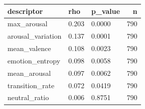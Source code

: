 \begin{tabular}{lllr}
\toprule
descriptor & rho & p\_value & n \\
\midrule
max\_arousal & 0.203 & 0.0000 & 790 \\
arousal\_variation & 0.137 & 0.0001 & 790 \\
mean\_valence & 0.108 & 0.0023 & 790 \\
emotion\_entropy & 0.098 & 0.0058 & 790 \\
mean\_arousal & 0.097 & 0.0062 & 790 \\
transition\_rate & 0.072 & 0.0419 & 790 \\
neutral\_ratio & 0.006 & 0.8751 & 790 \\
\bottomrule
\end{tabular}
